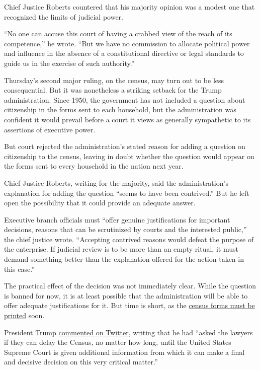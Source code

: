 Chief Justice Roberts countered that his majority opinion was a modest
one that recognized the limits of judicial power.

``No one can accuse this court of having a crabbed view of the reach of
its competence,'' he wrote. ``But we have no commission to allocate
political power and influence in the absence of a constitutional
directive or legal standards to guide us in the exercise of such
authority.''

Thursday's second major ruling, on the census, may turn out to be less
consequential. But it was nonetheless a striking setback for the Trump
administration. Since 1950, the government has not included a question
about citizenship in the forms sent to each household, but the
administration was confident it would prevail before a court it views as
generally sympathetic to its assertions of executive power.

But court rejected the administration's stated reason for adding a
question on citizenship to the census, leaving in doubt whether the
question would appear on the forms sent to every household in the nation
next year.

Chief Justice Roberts, writing for the majority, said the
administration's explanation for adding the question ``seems to have
been contrived.'' But he left open the possibility that it could provide
an adequate answer.

Executive branch officials must ``offer genuine justifications for
important decisions, reasons that can be scrutinized by courts and the
interested public,'' the chief justice wrote. ``Accepting contrived
reasons would defeat the purpose of the enterprise. If judicial review
is to be more than an empty ritual, it must demand something better than
the explanation offered for the action taken in this case.''

The practical effect of the decision was not immediately clear. While
the question is banned for now, it is at least possible that the
administration will be able to offer adequate justifications for it. But
time is short, as the
\href{https://www.nytimes.com/2019/06/27/us/census-printing.html}{census
forms must be printed} soon.

President Trump
\href{https://twitter.com/realDonaldTrump/status/1144298731887628288}{commented
on Twitter}, writing that he had ``asked the lawyers if they can delay
the Census, no matter how long, until the United States Supreme Court is
given additional information from which it can make a final and decisive
decision on this very critical matter.''

